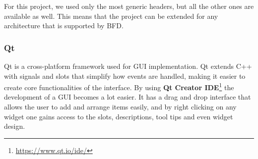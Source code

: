 For this project, we used only the most generic headers, but all the other ones are available as well. This means that the project can be extended for any architecture that is supported by BFD.

\subsubsection{Qt}
\label{sub-sec:qt}

Qt is a cross-platform framework used for GUI implementation. Qt extends C++ with signals and slots that simplify how events are handled, making it easier to create core functionalities of the interface. By using \textbf{Qt Creator IDE}\footnote{\url{https://www.qt.io/ide/}} the development of a GUI becomes a lot easier. It has a drag and drop interface that allows the user to add and arrange items easily, and by right clicking on any widget one gains access to the slots, descriptions, tool tips and even widget design.